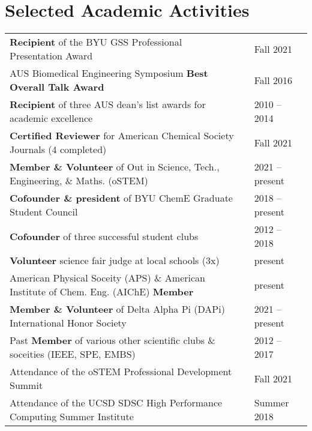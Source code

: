 \documentclass[letterpaper,11pt]{article}
\begin{document}

\vspace{-0.1cm}
\section*{Selected Academic Activities}
\begin{tabular}{@{}p{} p{} l@{}}
  \textbf{Recipient} of the BYU GSS Professional Presentation Award                                       & & Fall 2021 \\[4pt]
  AUS Biomedical Engineering Symposium \textbf{Best Overall Talk Award}                                   & & Fall 2016 \\[4pt]
  \textbf{Recipient} of three AUS dean's list awards for academic excellence                              & & 2010 -- 2014 \\[4pt]
  \textbf{Certified Reviewer} for American Chemical Society Journals (4 completed)                        & & Fall 2021 \\[4pt]
  \textbf{Member \& Volunteer} of Out in Science, Tech., Engineering, \& Maths. (oSTEM)                   & & 2021 -- present \\[4pt]
  \textbf{Cofounder \& president} of BYU ChemE Graduate Student Council                                   & & 2018 -- present \\[4pt]
  \textbf{Cofounder} of three successful student clubs                                                    & & 2012 -- 2018 \\[4pt]
  \textbf{Volunteer} science fair judge at local schools (3x)                                             & & present \\[4pt]
  American Physical Soceity (APS) \& American Institute of Chem. Eng. (AIChE) \textbf{Member}             & & present \\[4pt]
  \textbf{Member \& Volunteer} of Delta Alpha Pi (DAPi) International Honor Society                       & & 2021 -- present \\[4pt]
  Past \textbf{Member} of various other scientific clubs \& soceities (IEEE, SPE, EMBS)                   & & 2012 -- 2017 \\[4pt]
  Attendance of the oSTEM Professional Development Summit                                                 & & Fall 2021 \\[4pt]
  Attendance of the UCSD SDSC High Performance Computing Summer Institute                                 & & Summer 2018 \\[4pt]

\end{tabular}
\end{document}
